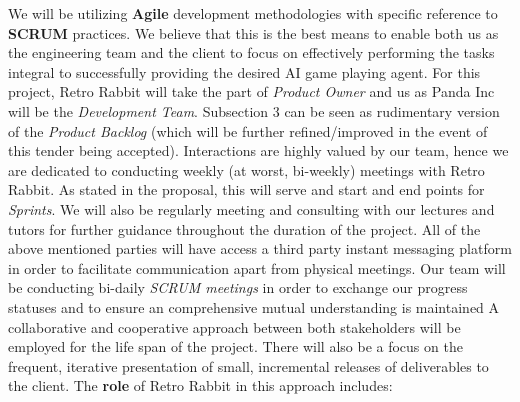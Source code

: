 \documentclass[11pt]{article}
\begin{document}
We will be utilizing \textbf{Agile} development methodologies with specific reference to \textbf{SCRUM} practices. We believe that this is the best means to enable both us as the engineering team and the client to focus on effectively performing the tasks integral to successfully providing the desired AI game playing agent. 
For this project, Retro Rabbit will take the part of \emph{Product Owner} and us as Panda Inc will be the \emph{Development Team}. Subsection 3 can be seen as rudimentary version of the \emph{Product Backlog} (which will be further refined/improved in the event of this tender being accepted).
\newline \newline
Interactions are highly valued by our team, hence we are dedicated to conducting weekly (at worst, bi-weekly) meetings with Retro Rabbit. As stated in the proposal, this will serve and start and end points for \emph{Sprints}. We will also be regularly meeting and consulting with our lectures and tutors for further guidance throughout the duration of the project. All of the above mentioned parties will have access a third party instant messaging platform in order to facilitate communication apart from physical meetings. Our team will be conducting bi-daily \emph{SCRUM meetings} in order to exchange our progress statuses and to ensure an comprehensive mutual understanding is maintained
\newline \newline
A collaborative and cooperative approach between both stakeholders will be employed for the life span of the project. There will also be a focus on the frequent, iterative presentation of small, incremental releases of deliverables to the client. The \textbf{role} of Retro Rabbit in this approach includes:
\end{document}
